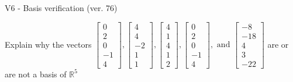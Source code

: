 \begin{exercise}
  \begin{exerciseTitle}V6 - Basis verification (ver. 76)\end{exerciseTitle}
  \begin{exerciseStatement}
    Explain why the vectors \(\left[\begin{array}{r}
0 \\
2 \\
0 \\
-1 \\
4
\end{array}\right] , \left[\begin{array}{r}
4 \\
4 \\
-2 \\
1 \\
1
\end{array}\right] , \left[\begin{array}{r}
4 \\
1 \\
4 \\
1 \\
2
\end{array}\right] , \left[\begin{array}{r}
0 \\
2 \\
0 \\
-1 \\
4
\end{array}\right] , \text{ and } \left[\begin{array}{r}
-8 \\
-18 \\
4 \\
3 \\
-22
\end{array}\right]\) are or are not a basis of \(\mathbb{R}^5\)	



\end{exerciseStatement}
\end{exercise}
